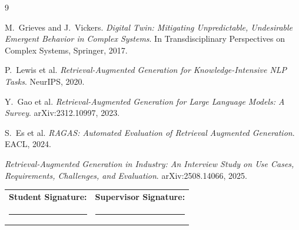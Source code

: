 \documentclass[10pt,a4paper]{article}
\begin{document}
\begingroup
\renewcommand{\refname}{\texorpdfstring{\color{mainblue}}{}Preliminary References}
\scriptsize
\begin{thebibliography}{9}
\setlength{\itemsep}{0pt}

M.\ Grieves and J.\ Vickers.
\textit{Digital Twin: Mitigating Unpredictable, Undesirable Emergent Behavior in Complex Systems}.
In Transdisciplinary Perspectives on Complex Systems, Springer, 2017.

P.\ Lewis et al.
\textit{Retrieval-Augmented Generation for Knowledge-Intensive NLP Tasks}.
NeurIPS, 2020.

Y.\ Gao et al.
\textit{Retrieval-Augmented Generation for Large Language Models: A Survey}.
arXiv:2312.10997, 2023.

S.\ Es et al.
\textit{RAGAS: Automated Evaluation of Retrieval Augmented Generation}.
EACL, 2024.

\textit{Retrieval-Augmented Generation in Industry: An Interview Study on Use Cases, Requirements, Challenges, and Evaluation}.
arXiv:2508.14066, 2025.

\end{thebibliography}
\endgroup

\vspace{0.1em}

\noindent
\begin{tabularx}{\textwidth}{X X}
\textbf{Student Signature:} & \textbf{Supervisor Signature:} \\[0.9em]
\rule{0.42\textwidth}{0.4pt} & \rule{0.42\textwidth}{0.4pt} \\
\end{tabularx}
\end{document}
